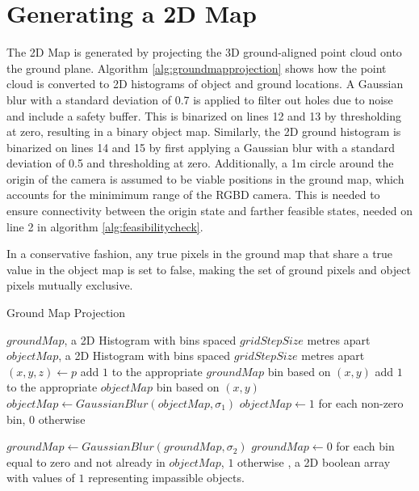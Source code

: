 \section{Generating a 2D Map}
\label{sec:2dmap}
The 2D Map is generated by projecting the 3D ground-aligned point cloud onto the
ground plane.
Algorithm \autoref{alg:groundmapprojection} shows how the point cloud is
converted to 2D histograms of object and ground locations. 
A Gaussian blur with
a standard deviation of 0.7 is applied to filter out holes due to noise and
include a safety buffer. This is binarized on lines 12 and 13 by thresholding at
zero, resulting in a binary object map.
Similarly, the 2D ground histogram is binarized on lines 14 and 15 by first applying a Gaussian
blur with a standard deviation of 0.5 and thresholding at zero. 
Additionally, a 1m circle around the origin of the camera is assumed to be
viable positions in the ground map, which accounts for the minimimum range of
the RGBD camera. This is needed to ensure connectivity between the origin state
and farther feasible states, needed on line 2 in algorithm
\autoref{alg:feasibilitycheck}.

In a conservative fashion, any true pixels in the ground map that share a true
value in the object map is set to false, making the set of ground pixels and
object pixels mutually exclusive. 

\begin{algorithm}
\caption{Ground Map Projection}
\label{alg:groundmapprojection}
\begin{algorithmic}[1]
\Statex
{}
    \State $groundMap$, a 2D Histogram with bins spaced $gridStepSize$ metres apart
    \State $objectMap$, a 2D Histogram with bins spaced $gridStepSize$ metres apart
        \State $(x,y,z) \gets p$
            \State add $1$ to the appropriate $groundMap$ bin based on $(x,y)$
        \Else
            \State add $1$ to the appropriate $objectMap$ bin based on $(x,y)$
        \EndIf
    \EndFor
    \State $objectMap \gets GaussianBlur(objectMap, \sigma_1)$
    \State $objectMap \gets 1$ for each non-zero bin, $0$ otherwise

    \State $groundMap \gets GaussianBlur(groundMap, \sigma_2)$
    \State $groundMap \gets 0$ for each bin equal to zero and not already in $objectMap$, $1$ otherwise
\EndFunction
\Statex
{}, a 2D boolean array with values of $1$ representing
impassible objects.
\end{algorithmic}
\end{algorithm}


